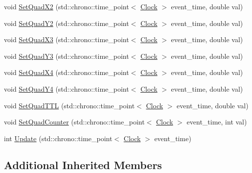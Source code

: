 \begin{DoxyCompactItemize}
\item 
void \hyperlink{class_quad_af1df44b73207c3e70b794e889e5225af}{Set\+Quad\+X2} (std\+::chrono\+::time\+\_\+point$<$ \hyperlink{universe_8h_a0ef8d951d1ca5ab3cfaf7ab4c7a6fd80}{Clock} $>$ event\+\_\+time, double val)
\item 
void \hyperlink{class_quad_afcec579c40a3763c34d1ace417888bf9}{Set\+Quad\+Y2} (std\+::chrono\+::time\+\_\+point$<$ \hyperlink{universe_8h_a0ef8d951d1ca5ab3cfaf7ab4c7a6fd80}{Clock} $>$ event\+\_\+time, double val)
\item 
void \hyperlink{class_quad_a0cbdd18a95fe7240b09c40fcee29f5df}{Set\+Quad\+X3} (std\+::chrono\+::time\+\_\+point$<$ \hyperlink{universe_8h_a0ef8d951d1ca5ab3cfaf7ab4c7a6fd80}{Clock} $>$ event\+\_\+time, double val)
\item 
void \hyperlink{class_quad_a1774a89a5d668aadf94966867270c0c5}{Set\+Quad\+Y3} (std\+::chrono\+::time\+\_\+point$<$ \hyperlink{universe_8h_a0ef8d951d1ca5ab3cfaf7ab4c7a6fd80}{Clock} $>$ event\+\_\+time, double val)
\item 
void \hyperlink{class_quad_ac49d711fa31a12ba24ad65c959c74e05}{Set\+Quad\+X4} (std\+::chrono\+::time\+\_\+point$<$ \hyperlink{universe_8h_a0ef8d951d1ca5ab3cfaf7ab4c7a6fd80}{Clock} $>$ event\+\_\+time, double val)
\item 
void \hyperlink{class_quad_ae299f75dcd479f5eb6ba8efed578961b}{Set\+Quad\+Y4} (std\+::chrono\+::time\+\_\+point$<$ \hyperlink{universe_8h_a0ef8d951d1ca5ab3cfaf7ab4c7a6fd80}{Clock} $>$ event\+\_\+time, double val)
\item 
void \hyperlink{class_quad_a4d3a52272d572315198623e836ac0a97}{Set\+Quad\+T\+TL} (std\+::chrono\+::time\+\_\+point$<$ \hyperlink{universe_8h_a0ef8d951d1ca5ab3cfaf7ab4c7a6fd80}{Clock} $>$ event\+\_\+time, double val)
\item 
void \hyperlink{class_quad_a66ba58a32cf7b351e3e155efbdb46f8e}{Set\+Quad\+Counter} (std\+::chrono\+::time\+\_\+point$<$ \hyperlink{universe_8h_a0ef8d951d1ca5ab3cfaf7ab4c7a6fd80}{Clock} $>$ event\+\_\+time, int val)
\item 
int \hyperlink{class_quad_a0710e6a7d77a34fdadbd2c36d03ade62}{Update} (std\+::chrono\+::time\+\_\+point$<$ \hyperlink{universe_8h_a0ef8d951d1ca5ab3cfaf7ab4c7a6fd80}{Clock} $>$ event\+\_\+time)
\end{DoxyCompactItemize}
\subsection*{Additional Inherited Members}


